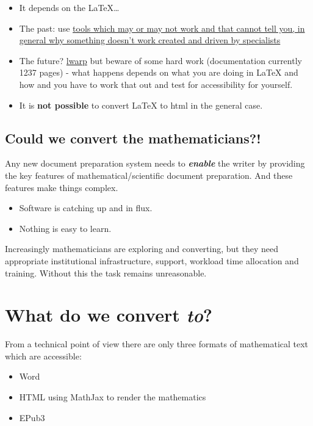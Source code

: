 \documentclass[
  10pt,
  a4paper]{article}
\providecommand{\tightlist}{%
  \setlength{\itemsep}{0pt}\setlength{\parskip}{0pt}}
\begin{document}
\begin{itemize}
\tightlist
\item
  It depends on the LaTeX\ldots{}
\item
  The past: use \href{https://hub.docker.com/r/bathmash/mathaltnotes}{tools which may or may not work and that cannot tell you, in general why something doesn't work created and driven by specialists}
\item
  The future? \href{https://ctan.org/pkg/lwarp?lang=en}{lwarp} but beware of some hard work (documentation currently 1237 pages) - what happens depends on what you are doing in LaTeX and how and you have to work that out and test for accessibility for yourself.
\item
  It is \textbf{not possible} to convert LaTeX to html in the general case.
\end{itemize}

\hypertarget{could-we-convert-the-mathematicians}{%
\subsection{Could we convert the mathematicians?!}\label{could-we-convert-the-mathematicians}}

Any new document preparation system needs to \textbf{\emph{enable}} the writer by providing the key features of mathematical/scientific document preparation. And these features make things complex.

\begin{itemize}
\tightlist
\item
  Software is catching up and in flux.
\item
  Nothing is easy to learn.
\end{itemize}

Increasingly mathematicians are exploring and converting, but they need appropriate institutional infrastructure, support, workload time allocation and training. Without this the task remains unreasonable.

\hypertarget{what-do-we-convert-to}{%
\section{\texorpdfstring{What do we convert \textbf{\emph{to}}?}{What do we convert to?}}\label{what-do-we-convert-to}}

From a technical point of view there are only three formats of mathematical text which are accessible:

\begin{itemize}
\tightlist
\item
  Word
\item
  HTML using MathJax to render the mathematics
\item
  EPub3
\end{itemize}
\end{document}
